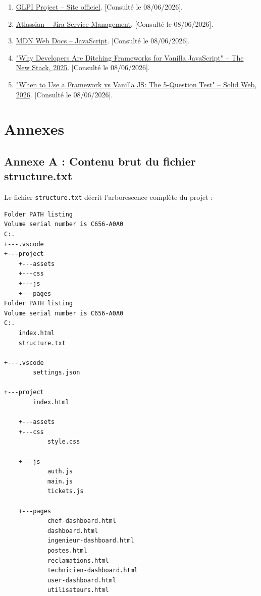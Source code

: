 \documentclass[12pt,a4paper,twoside]{report}
\begin{document}
\begin{enumerate}
    \item \href{https://glpi-project.org}{GLPI Project -- Site officiel}. [Consulté le 08/06/2026].
    \item \href{https://www.atlassian.com/software/jira/service-management}{Atlassian -- Jira Service Management}. [Consulté le 08/06/2026].
    \item \href{https://developer.mozilla.org/fr/docs/Web/JavaScript}{MDN Web Docs -- JavaScript}. [Consulté le 08/06/2026].
    \item \href{https://thenewstack.io/why-developers-are-ditching-frameworks-for-vanilla-javascript/}{"Why Developers Are Ditching Frameworks for Vanilla JavaScript" -- The New Stack, 2025}. [Consulté le 08/06/2026].
    \item \href{https://solid-web.com/when-to-use-framework-vs-vanilla-javascript/}{"When to Use a Framework vs Vanilla JS: The 5-Question Test" -- Solid Web, 2026}. [Consulté le 08/06/2026].
\end{enumerate}

\appendix
\chapter{Annexes}

\section{Annexe A : Contenu brut du fichier structure.txt}

Le fichier \texttt{structure.txt} décrit l'arborescence complète du projet :

\begin{verbatim}
Folder PATH listing
Volume serial number is C656-A0A0
C:.
+---.vscode
+---project
    +---assets
    +---css
    +---js
    +---pages
Folder PATH listing
Volume serial number is C656-A0A0
C:.
    index.html
    structure.txt
    
+---.vscode
        settings.json
        
+---project
        index.html
        
    +---assets
    +---css
            style.css
            
    +---js
            auth.js
            main.js
            tickets.js
            
    +---pages
            chef-dashboard.html
            dashboard.html
            ingenieur-dashboard.html
            postes.html
            reclamations.html
            technicien-dashboard.html
            user-dashboard.html
            utilisateurs.html
\end{verbatim}
\end{document}
